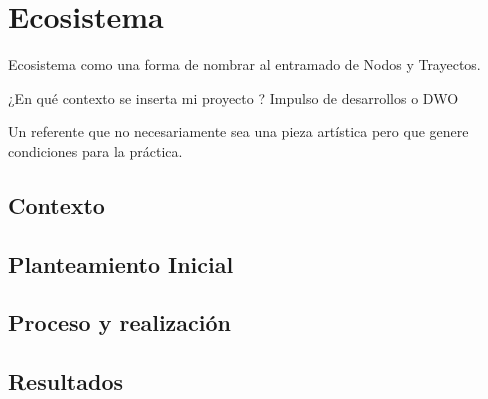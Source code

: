 \section{Ecosistema}

Ecosistema como una forma de nombrar al entramado de Nodos y Trayectos. 

¿En qué contexto se inserta mi proyecto ? Impulso de desarrollos o DWO

Un referente que no necesariamente sea una pieza artística pero que genere condiciones para la práctica. 

\subsection{Contexto}
\subsection{Planteamiento Inicial}
\subsection{Proceso y realización}



\subsection{Resultados}
